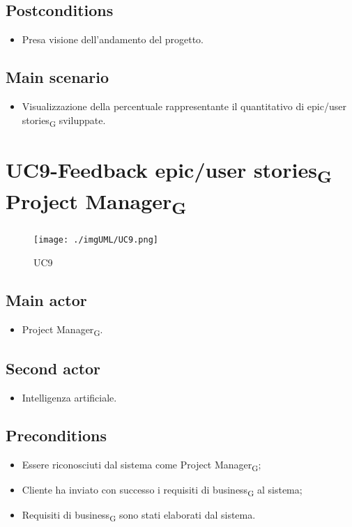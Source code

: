 \documentclass{article}
\begin{document}
    \subsection*{Postconditions}
        \begin{itemize}
            \item Presa visione dell'andamento del progetto.
        \end{itemize}
        
    \subsection*{Main scenario}
        
        \begin{itemize}
            \item Visualizzazione della percentuale rappresentante il quantitativo di epic/user stories\textsubscript{G} sviluppate.
        \end{itemize}
        

\section{UC9-Feedback epic/user stories\textsubscript{G} Project Manager\textsubscript{G}}
    \begin{figure}[h]
      \centering
      \texttt{[image: ./imgUML/UC9.png]}
    \caption{UC9}      
      \label{fig:UC9}
    \end{figure}
    \subsection*{Main actor}
    \begin{itemize}
        \item Project Manager\textsubscript{G}.
    \end{itemize}
    \subsection{Second actor}
    \begin{itemize}
        \item Intelligenza artificiale.
    \end{itemize}
    
    \subsection*{Preconditions}
        \begin{itemize}
            \item Essere riconosciuti dal sistema come Project Manager\textsubscript{G};
            \item Cliente ha inviato con successo i requisiti di business\textsubscript{G} al sistema;
            \item Requisiti di business\textsubscript{G} sono stati elaborati dal sistema.
        \end{itemize}
        
\end{document}
